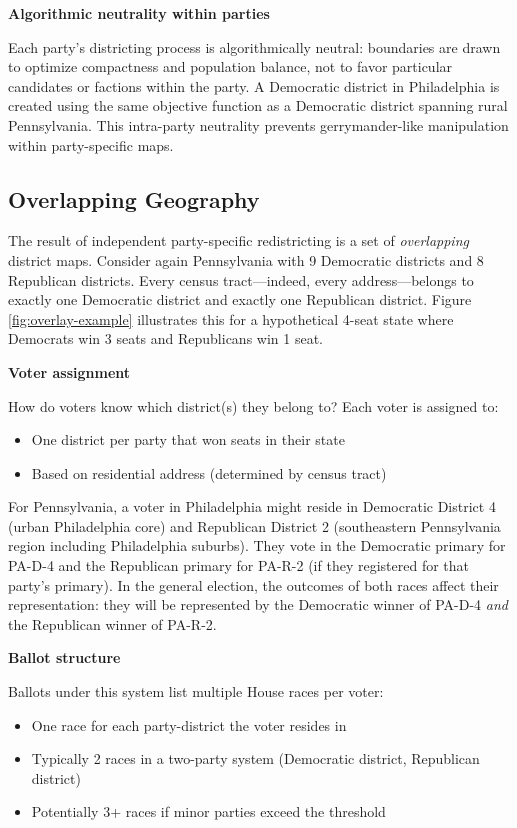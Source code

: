 \textbf{Algorithmic neutrality within parties}

Each party's districting process is algorithmically neutral: boundaries are drawn to optimize compactness and population balance, not to favor particular candidates or factions within the party. A Democratic district in Philadelphia is created using the same objective function as a Democratic district spanning rural Pennsylvania. This intra-party neutrality prevents gerrymander-like manipulation within party-specific maps.

\subsection{Overlapping Geography}

The result of independent party-specific redistricting is a set of \emph{overlapping} district maps. Consider again Pennsylvania with 9 Democratic districts and 8 Republican districts. Every census tract—indeed, every address—belongs to exactly one Democratic district and exactly one Republican district. Figure \ref{fig:overlay-example} illustrates this for a hypothetical 4-seat state where Democrats win 3 seats and Republicans win 1 seat.

\textbf{Voter assignment}

How do voters know which district(s) they belong to? Each voter is assigned to:
\begin{itemize}
    \item One district per party that won seats in their state
    \item Based on residential address (determined by census tract)
\end{itemize}

For Pennsylvania, a voter in Philadelphia might reside in Democratic District 4 (urban Philadelphia core) and Republican District 2 (southeastern Pennsylvania region including Philadelphia suburbs). They vote in the Democratic primary for PA-D-4 and the Republican primary for PA-R-2 (if they registered for that party's primary). In the general election, the outcomes of both races affect their representation: they will be represented by the Democratic winner of PA-D-4 \emph{and} the Republican winner of PA-R-2.

\textbf{Ballot structure}

Ballots under this system list multiple House races per voter:
\begin{itemize}
    \item One race for each party-district the voter resides in
    \item Typically 2 races in a two-party system (Democratic district, Republican district)
    \item Potentially 3+ races if minor parties exceed the threshold
\end{itemize}

